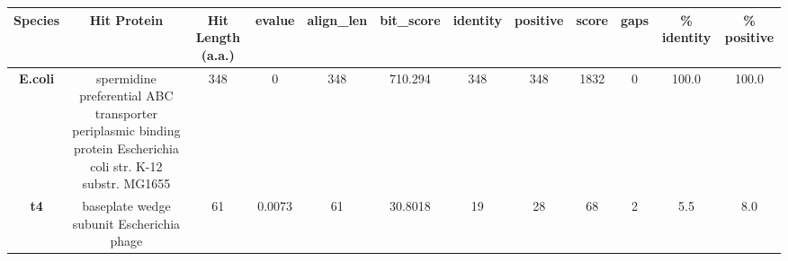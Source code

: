 \begin{tabular}{|c|c|c|c|c|c|c|c|c|c|c|c|} \hline
\textbf{Species} & \textbf{Hit Protein} & \textbf{Hit Length (a.a.)} & \textbf{evalue} & \textbf{align\_len} & \textbf{bit\_score} & \textbf{identity} & \textbf{positive} & \textbf{score} & \textbf{gaps} & \textbf{\% identity} & \textbf{\% positive} \\ \hline
\textbf{E.coli} & spermidine preferential ABC transporter periplasmic binding protein Escherichia coli str. K-12 substr. MG1655 & 348 & 0 & 348 & 710.294 & 348 & 348 & 1832 & 0 & 100.0 & 100.0\\
\textbf{t4} & baseplate wedge subunit Escherichia phage  & 61 & 0.0073 & 61 & 30.8018 & 19 & 28 & 68 & 2 & 5.5 & 8.0\\
\hline \end{tabular}
